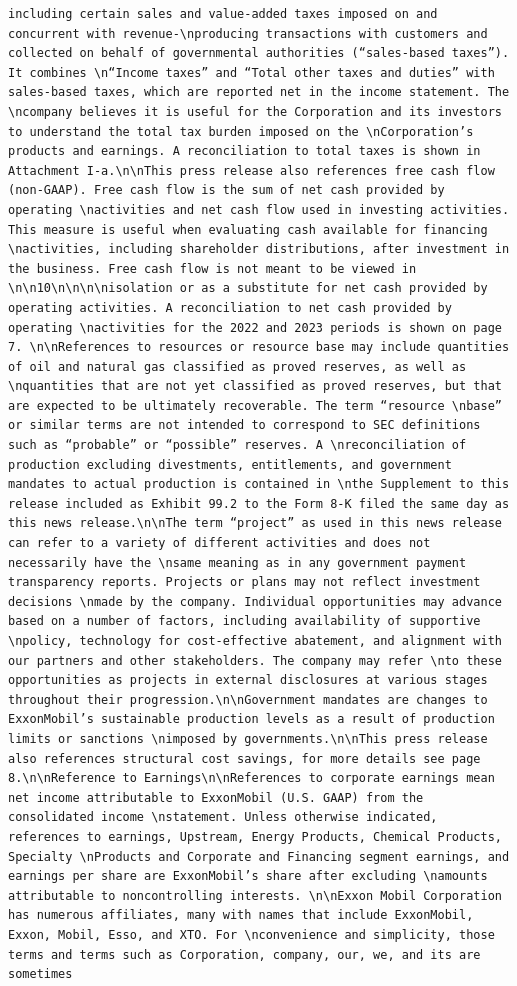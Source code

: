 \documentclass[
  letterpaper,
  DIV=11,
  numbers=noendperiod]{scrreprt}
\begin{document}
\begin{verbatim}
including certain sales and value-added taxes imposed on and concurrent with revenue-\nproducing transactions with customers and collected on behalf of governmental authorities (“sales-based taxes”). It combines \n“Income taxes” and “Total other taxes and duties” with sales-based taxes, which are reported net in the income statement. The \ncompany believes it is useful for the Corporation and its investors to understand the total tax burden imposed on the \nCorporation’s products and earnings. A reconciliation to total taxes is shown in Attachment I-a.\n\nThis press release also references free cash flow (non-GAAP). Free cash flow is the sum of net cash provided by operating \nactivities and net cash flow used in investing activities. This measure is useful when evaluating cash available for financing \nactivities, including shareholder distributions, after investment in the business. Free cash flow is not meant to be viewed in \n\n10\n\n\n\nisolation or as a substitute for net cash provided by operating activities. A reconciliation to net cash provided by operating \nactivities for the 2022 and 2023 periods is shown on page 7. \n\nReferences to resources or resource base may include quantities of oil and natural gas classified as proved reserves, as well as \nquantities that are not yet classified as proved reserves, but that are expected to be ultimately recoverable. The term “resource \nbase” or similar terms are not intended to correspond to SEC definitions such as “probable” or “possible” reserves. A \nreconciliation of production excluding divestments, entitlements, and government mandates to actual production is contained in \nthe Supplement to this release included as Exhibit 99.2 to the Form 8-K filed the same day as this news release.\n\nThe term “project” as used in this news release can refer to a variety of different activities and does not necessarily have the \nsame meaning as in any government payment transparency reports. Projects or plans may not reflect investment decisions \nmade by the company. Individual opportunities may advance based on a number of factors, including availability of supportive \npolicy, technology for cost-effective abatement, and alignment with our partners and other stakeholders. The company may refer \nto these opportunities as projects in external disclosures at various stages throughout their progression.\n\nGovernment mandates are changes to ExxonMobil’s sustainable production levels as a result of production limits or sanctions \nimposed by governments.\n\nThis press release also references structural cost savings, for more details see page 8.\n\nReference to Earnings\n\nReferences to corporate earnings mean net income attributable to ExxonMobil (U.S. GAAP) from the consolidated income \nstatement. Unless otherwise indicated, references to earnings, Upstream, Energy Products, Chemical Products, Specialty \nProducts and Corporate and Financing segment earnings, and earnings per share are ExxonMobil’s share after excluding \namounts attributable to noncontrolling interests. \n\nExxon Mobil Corporation has numerous affiliates, many with names that include ExxonMobil, Exxon, Mobil, Esso, and XTO. For \nconvenience and simplicity, those terms and terms such as Corporation, company, our, we, and its are sometimes 
\end{verbatim}
\end{document}
